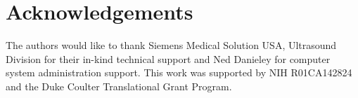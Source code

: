 \section*{Acknowledgements} 
The authors would like to thank Siemens Medical Solution USA, Ultrasound
Division for their in-kind technical support and Ned Danieley for computer
system administration support.  This work was supported by NIH R01CA142824 and
the Duke Coulter Translational Grant Program.

